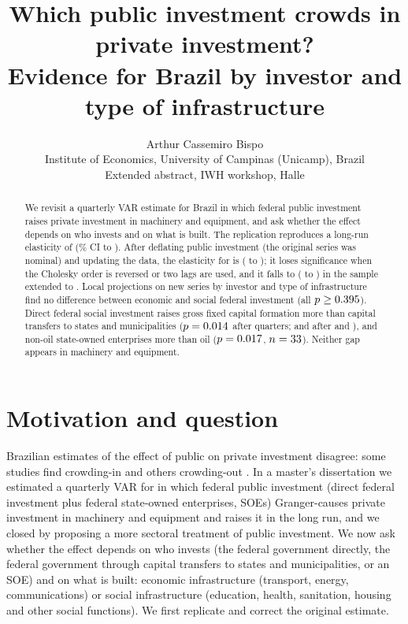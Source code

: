\documentclass[11pt,a4paper]{article}
\title{\vspace{-8ex}Which public investment crowds in private investment?\\ Evidence for Brazil by investor and type of infrastructure}
\author{Arthur Cassemiro Bispo\\[0.2ex]
  \small Institute of Economics, University of Campinas (Unicamp), Brazil\\
  \small Extended abstract, IWH workshop, Halle}
\date{\vspace{-5ex}}
\begin{document}
\maketitle
\vspace{-4ex}

\begin{abstract}
\noindent We revisit a quarterly VAR estimate for Brazil in which federal public investment raises private investment in machinery and equipment, and ask whether the effect depends on who invests and on what is built. The replication reproduces a long-run elasticity of \ElastRep{} (\CILevel\% CI \ElastRepLo{} to \ElastRepHi{}). After deflating public investment (the original series was nominal) and updating the data, the elasticity for \SampleCorr{} is \ElastCorr{} (\ElastCorrLo{} to \ElastCorrHi{}); it loses significance when the Cholesky order is reversed or two lags are used, and it falls to \ElastExt{} (\ElastExtLo{} to \ElastExtHi{}) in the sample extended to \SampleEndYear{}. Local projections on new series by investor and type of infrastructure find no difference between economic and social federal investment (all $p \geq 0.395$). Direct federal social investment raises gross fixed capital formation more than capital transfers to states and municipalities ($p = 0.014$ after \hA{} quarters; \SocTrHBp{} and \SocTrHCp{} after \hB{} and \hC{}), and non-oil state-owned enterprises more than oil ($p = 0.017$, $n = 33$). Neither gap appears in machinery and equipment.
\end{abstract}
\vspace{-1.5ex}

\section{Motivation and question}

Brazilian estimates of the effect of public on private investment disagree: some studies find crowding-in \citep{reis2019, iasco2023} and others crowding-out \citep{jacinto1998, oliveira2020}. In a master's dissertation we estimated a quarterly VAR for \SampleOrig{} in which federal public investment (direct federal investment plus federal state-owned enterprises, SOEs) Granger-causes private investment in machinery and equipment and raises it in the long run, and we closed by proposing a more sectoral treatment of public investment. We now ask whether the effect depends on who invests (the federal government directly, the federal government through capital transfers to states and municipalities, or an SOE) and on what is built: economic infrastructure (transport, energy, communications) or social infrastructure (education, health, sanitation, housing and other social functions). We first replicate and correct the original estimate.
\end{document}
